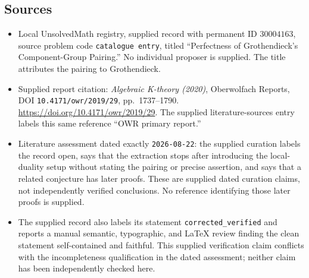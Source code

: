 \documentclass[11pt]{article}
\begin{document}
\subsection{Sources}
\begin{itemize}
\item Local UnsolvedMath registry, supplied record with permanent ID \(30004163\), source problem code \texttt{catalogue entry}, titled ``Perfectness of Grothendieck's Component-Group Pairing.'' No individual proposer is supplied. The title attributes the pairing to Grothendieck.
\item Supplied report citation: \emph{Algebraic K-theory (2020)}, Oberwolfach Reports, DOI \texttt{10.4171/owr/2019/29}, pp.\ 1737--1790. \url{https://doi.org/10.4171/owr/2019/29}. The supplied literature-sources entry labels this same reference ``OWR primary report.''
\item Literature assessment dated exactly \texttt{2026-08-22}: the supplied curation labels the record open, says that the extraction stops after introducing the local-duality setup without stating the pairing or precise assertion, and says that a related conjecture has later proofs. These are supplied dated curation claims, not independently verified conclusions. No reference identifying those later proofs is supplied.
\item The supplied record also labels its statement \texttt{corrected\_verified} and reports a manual semantic, typographic, and LaTeX review finding the clean statement self-contained and faithful. This supplied verification claim conflicts with the incompleteness qualification in the dated assessment; neither claim has been independently checked here.
\end{itemize}
\end{document}

